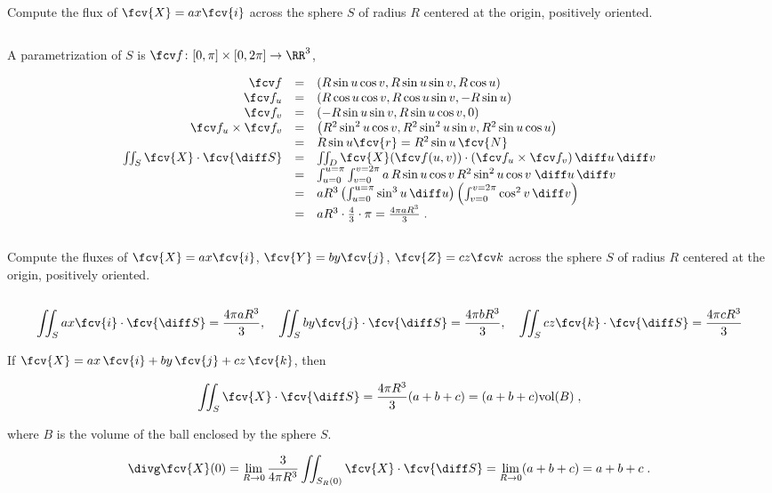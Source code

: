 \begin{frame}
\begin{example}
\begin{columns}

Compute the flux of  $\fcv{X} = ax \fcv{i}$ across the sphere $S$ of radius $R$ centered at the origin, positively oriented.
\end{columns}

A parametrization of $S$ is $\fcv f \colon [0,\pi] \times [0,2\pi]\to \RR^3$,

\[
\begin{array}{rcl}
\fcv f &=& (R\sin{u}\cos{v}, R\sin{u}\sin{v}, R\cos{u}) \\
\fcv f_u &=& \left( R\cos{u}\cos{v}, R\cos{u}\sin{v}, -R\sin{u}\right) \\
\fcv f_v &= & \left( -R\sin{u}\sin{v}, R\sin{u}\cos{v}, 0 \right)\\
\fcv f_u \times \fcv f_v & =& \left( R^2\sin^2{u}\cos{v}, R^2\sin^2{u}\sin{v}, R^2\sin{u}\cos{u} \right) \\
&=& R\sin{u}  \fcv{r} = R^2\sin{u}\, \fcv{N}\\
\iint_S \fcv{X} \cdot \fcv{\diff S}&= & \iint_D \fcv{X}(\fcv f(u,v)) \cdot (\fcv f_u \times \fcv f_v) \, \diff u\, \diff v  \\
&= & \int_{u=0}^{u=\pi} \int_{v=0}^{v=2\pi} a\, R\sin{u}\cos{v}\, R^2\sin^2{u}\cos{v}\; \diff u\, \diff v  \\
&= & aR^3 \left( \int_{u=0}^{u=\pi} \sin^3{u} \, \diff u \right) \left( \int_{v=0}^{v=2\pi} \cos^2{v}\, \diff v \right) \\
&=& aR^3 \cdot \frac{4}{3} \cdot \pi = \frac{4\pi aR^3}{3}\; .
\end{array}
\]

\end{example}
\end{frame}

\begin{frame}
\begin{example}
\begin{columns}

Compute the fluxes of  $\fcv{X} = ax \fcv{i}$,  $\fcv{Y} = by \fcv{j}$,  $\fcv{Z}=cz \fcv k$ across the sphere $S$ of radius $R$ centered at the origin, positively oriented.
\end{columns}

$$\iint_S ax\fcv{i} \cdot \fcv{\diff S}= \frac{4\pi aR^3}{3} ,\quad
\iint_S by\fcv{j} \cdot \fcv{\diff S}= \frac{4\pi bR^3}{3},\quad
\iint_S cz\fcv{k} \cdot \fcv{\diff S}= \frac{4\pi cR^3}{3}
 $$

\pause If $\fcv{X} = ax\, \fcv{i} + by\, \fcv{j} + cz\, \fcv{k}$, then

$$\iint_S \fcv{X} \cdot \fcv{\diff S} = \frac{4\pi R^3}{3} (a+b+c) = (a+b+c) \text{vol}(B)\; ,$$

where $B$ is the volume of the ball enclosed by the sphere $S$.

\[
\divg \fcv{X} (0) = \lim_{R\to 0} \frac{3}{4\pi R^3} \iint_{S_R(0)} \fcv{X} \cdot \fcv{\diff S} = \lim_{R \to 0} (a+b+c) = a+b+c\; .
\]

\end{example}
\end{frame}